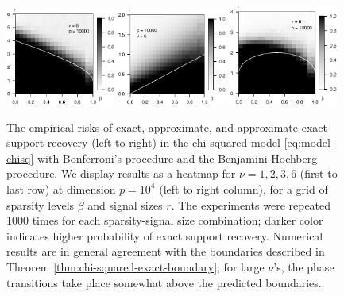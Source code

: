 \begin{figure}
	\includegraphics[width=0.32\textwidth]{sim_strong_boundary/simulated_strong_boundary_chi-squared_nu6_p10000.eps}
    \includegraphics[width=0.32\textwidth]{sim_weak_boundary/simulated_weak_boundary_chi-squared_nu6_p10000.eps}
    \includegraphics[width=0.32\textwidth]{sim_approx-exact_boundary/simulated_approx-exact_boundary_chi-squared_nu6_p10000.eps}
	\caption{The empirical risks of exact, approximate, and approximate-exact support recovery (left to right) in the chi-squared model \eqref{eq:model-chisq} with Bonferroni's procedure and the Benjamini-Hochberg procedure. 
		We display results as a heatmap for $\nu=1, 2, 3, 6$ (first to last row) at dimension $p=10^4$ (left to right column), for a grid of sparsity levels $\beta$ and signal sizes $r$.
		The experiments were repeated 1000 times for each sparsity-signal size combination; darker color indicates higher probability of exact support recovery.  
		Numerical results are in general agreement with the boundaries described in Theorem \ref{thm:chi-squared-exact-boundary}; for large $\nu$'s, the phase transitions take place somewhat above the predicted boundaries.} 
	\label{fig:phase-simulated-chi-squared}
\end{figure}



